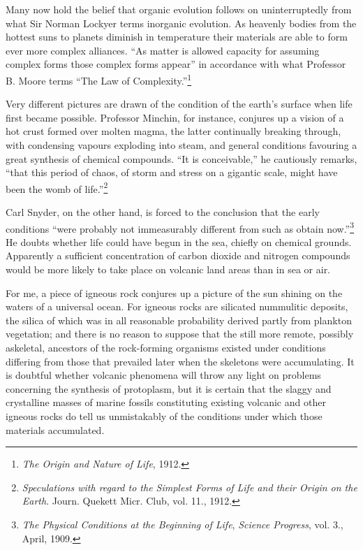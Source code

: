 \documentclass[a4paper, 12pt, oneside, landscape]{article}
\begin{document}
Many now hold the belief that organic evolution follows on uninterruptedly from what Sir Norman Lockyer terms inorganic evolution. As heavenly bodies from the hottest suns to planets diminish in temperature their materials are able to form ever more complex alliances. ``As matter is allowed capacity for assuming complex forms those complex forms appear'' in accordance with what Professor B. Moore terms ``The Law of Complexity.''\footnote{\emph{The Origin and Nature of Life}, 1912.}

Very different pictures are drawn of the condition of the earth's surface when life first became possible. Professor Minchin, for instance, conjures up a vision of a hot crust formed over molten magma, the latter continually breaking through, with condensing vapours exploding into steam, and general conditions favouring a great synthesis of chemical compounds. ``It is conceivable,'' he cautiously remarks, ``that this period of chaos, of storm and stress on a gigantic scale, might have been the womb of life.''\footnote{\emph{Speculations with regard to the Simplest Forms of Life and their Origin on the Earth}. Journ. Quekett Micr. Club, vol. 11., 1912.}

Carl Snyder, on the other hand, is forced to the conclusion that the early conditions ``were probably not immeasurably different from such as obtain now.''\footnote{\emph{The Physical Conditions at the Beginning of Life}, \emph{Science Progress}, vol. 3., April, 1909.} He doubts whether life could have begun in the sea, chiefly on chemical grounds. Apparently a sufficient concentration of carbon dioxide and nitrogen compounds would be more likely to take place on volcanic land areas than in sea or air.

For me, a piece of igneous rock conjures up a picture of the sun shining on the waters of a universal ocean. For igneous rocks are silicated nummulitic deposits, the silica of which was in all reasonable probability derived partly from plankton vegetation; and there is no reason to suppose that the still more remote, possibly askeletal, ancestors of the rock-forming organisms existed under conditions differing from those that prevailed later when the skeletons were accumulating. It is doubtful whether volcanic phenomena will throw any light on problems concerning the synthesis of protoplasm, but it is certain that the slaggy and crystalline masses of marine fossils constituting existing volcanic and other igneous rocks do tell us unmistakably of the conditions under which those materials accumulated.
\end{document}
